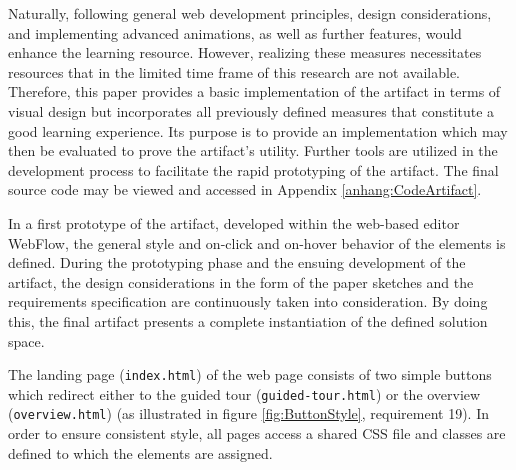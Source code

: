 Naturally, following general web development principles, design considerations, and implementing advanced animations, as well as further features, would enhance the learning resource. However, realizing these measures necessitates resources that in the limited time frame of this research are not available. Therefore, this paper provides a basic implementation of the artifact in terms of visual design but incorporates all previously defined measures that constitute a good learning experience. Its purpose is to provide an implementation which may then be evaluated to prove the artifact's utility. Further tools are utilized in the development process to facilitate the rapid prototyping of the artifact. The final source code may be viewed and accessed in Appendix \ref{anhang:CodeArtifact}.



In a first prototype of the artifact, developed within the web-based editor WebFlow, the general style and on-click and on-hover behavior of the elements is defined. During the prototyping phase and the ensuing development of the artifact, the design considerations in the form of the paper sketches and the requirements specification are continuously taken into consideration. By doing this, the final artifact presents a complete instantiation of the defined solution space.

The landing page (\texttt{index.html}) of the web page consists of two simple buttons which redirect either to the guided tour (\texttt{guided-tour.html}) or the overview (\texttt{overview.html}) (as illustrated in figure \ref{fig:ButtonStyle}, requirement 19). In order to ensure consistent style, all pages access a shared \ac{CSS} file and classes are defined to which the elements are assigned. 

